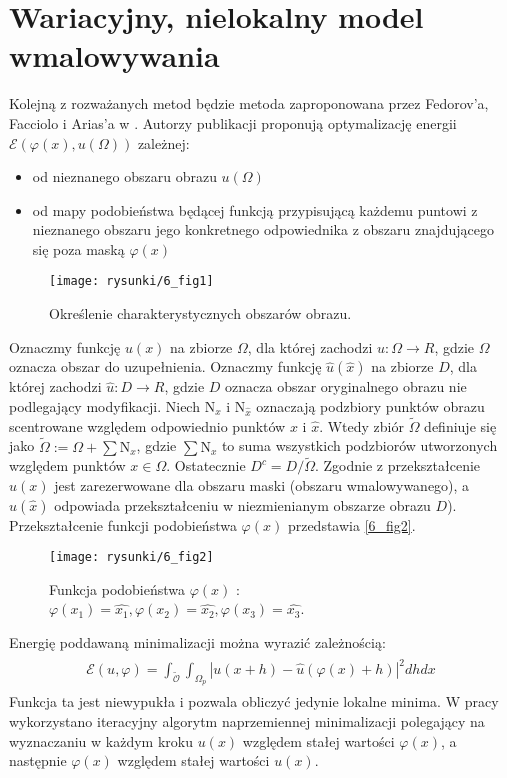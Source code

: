 \documentclass[12pt, twoside, openany]{report}
\theoremstyle{definition}
\newcommand*{\abs}[1]{\left\vert{#1}\right\vert}
\begin{document}
\section{Wariacyjny, nielokalny model wmalowywania}
Kolejną z rozważanych metod będzie metoda zaproponowana przez Fedorov'a, Facciolo i Arias'a w \cite{arias2011variational}. Autorzy publikacji proponują optymalizację energii $\mathcal{E}(\varphi(x), u(\Omega))$ zależnej:
\begin{itemize}
\item
od nieznanego obszaru obrazu $u(\Omega)$
\item
od mapy podobieństwa będącej funkcją przypisującą każdemu puntowi z nieznanego obszaru jego konkretnego odpowiednika z obszaru znajdującego się poza maską $\varphi(x)$
\end{itemize}
\begin{figure}[!h]
	\centering
	\texttt{[image: rysunki/6\_fig1]}
	\caption{Określenie charakterystycznych obszarów obrazu.}
	\label{6_fig1}
\end{figure}
Oznaczmy funkcję $u(x)$ na zbiorze $\Omega$, dla której zachodzi $u:\Omega \rightarrow R$, gdzie $\Omega$ oznacza obszar do uzupełnienia.
Oznaczmy funkcję $\hat{u}(\hat{x})$ na zbiorze $D$, dla której zachodzi $\hat{u} : D \rightarrow R$, gdzie $D$ oznacza obszar oryginalnego obrazu nie podlegający modyfikacji.
Niech $\mathrm{N}_x$ i $\mathrm{N}_{\hat{x}}$ oznaczają podzbiory punktów obrazu scentrowane względem odpowiednio punktów $x$ i $\hat{x}$.
Wtedy zbiór $\widetilde{\Omega}$ definiuje się jako $\widetilde{\Omega} := \Omega + \sum {\mathrm{N}}_x$, gdzie $\sum {\mathrm{N}}_x$ to suma wszystkich podzbiorów utworzonych względem punktów $x \in \Omega$. Ostatecznie $D^c = D / \widetilde{\Omega}$.
Zgodnie z \cite{arias2011variational} przekształcenie $u(x)$ jest zarezerwowane dla obszaru maski (obszaru wmalowywanego), a $\hat{u}(\hat{x})$ odpowiada przekształceniu w niezmienianym obszarze obrazu $D$). 
Przekształcenie funkcji podobieństwa $\varphi(x)$ przedstawia \autoref{6_fig2}.
\begin{figure}[!h]
	\centering
	\texttt{[image: rysunki/6\_fig2]}
	\caption{Funkcja podobieństwa $\varphi(x)$ : $\varphi(x_1)=\hat{x_1}, \varphi(x_2)=\hat{x_2}, \varphi(x_3)=\hat{x_3}$.}
	\label{6_fig2}
\end{figure}
Energię poddawaną minimalizacji można wyrazić zależnością:
\begin{align}
\begin{aligned}
\mathcal{E}(u,\varphi) = \int_{\mathcal{\widetilde{O}}}\int_{\Omega_p}\abs{u(x+h) - \hat{u}(\varphi(x)+h)}^2dhdx
\end{aligned}
\end{align}
Funkcja ta jest niewypukła i pozwala obliczyć jedynie lokalne minima. W pracy wykorzystano iteracyjny algorytm naprzemiennej minimalizacji polegający na wyznaczaniu w każdym kroku $u(x)$ względem stałej wartości $\varphi(x)$, a następnie $\varphi(x)$ względem stałej wartości $u(x)$.
\end{document}
